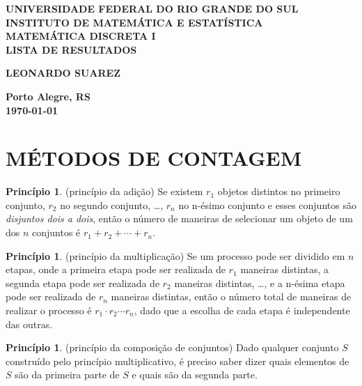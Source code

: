 \documentclass[12pt]{article}
\theoremstyle{plain}
\theoremstyle{definition}
\newtheorem{prcp}[thm]{Princípio}
\theoremstyle{remark}
\begin{document}
\begin{center}
    \textbf{\large UNIVERSIDADE FEDERAL DO RIO GRANDE DO SUL} \\
    \textbf{\large INSTITUTO DE MATEMÁTICA E ESTATÍSTICA} \\
    \vspace{3cm}
    \textbf{\Large MATEMÁTICA DISCRETA I} \\
    \vspace{1cm}
    \textbf{\large LISTA DE RESULTADOS} \\
    \vspace{3cm}

    \textbf{LEONARDO SUAREZ}

    \vfill
    \textbf{\large Porto Alegre, RS} \\
    \textbf{\large \today}
\end{center}

\newpage
\tableofcontents
\newpage

\section{MÉTODOS DE CONTAGEM}
\begin{prcp} (princípio da adição)
    Se existem \(r_1\) objetos distintos no primeiro conjunto, \(r_2\) no segundo conjunto, \ldots, \(r_n\) no n-ésimo conjunto e esses conjuntos são \emph{disjuntos dois a dois}, então o número de maneiras de selecionar um objeto de um dos \(n\) conjuntos é \(r_1 + r_2 + \cdots + r_n\).
\end{prcp}

\begin{prcp} (princípio da multiplicação)
    Se um processo pode ser dividido em \(n\) etapas, onde a primeira etapa pode ser realizada de \(r_1\) maneiras distintas, a segunda etapa pode ser realizada de \(r_2\) maneiras distintas, \ldots, e a n-ésima etapa pode ser realizada de \(r_n\) maneiras distintas, então o número total de maneiras de realizar o processo é \(r_1 \cdot r_2 \cdots r_n\), dado que a escolha de cada etapa é independente das outras.
\end{prcp}

\begin{prcp} (princípio da composição de conjuntos)
    Dado qualquer conjunto \(S\) construído pelo princípio multiplicativo, é preciso saber dizer quais elementos de \(S\) são da primeira parte de \(S\) e quais são da segunda parte.
\end{prcp}
\end{document}
